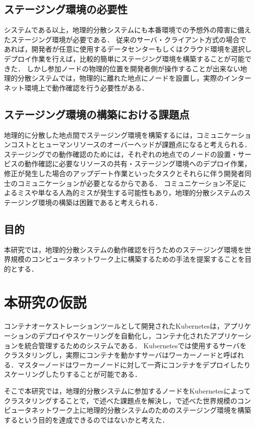 \subsection{ステージング環境の必要性}
システムである以上，地理的分散システムにも本番環境での予想外の障害に備えたステージング環境が必要である．
従来のサーバ・クライアント方式の場合であれば，開発者が任意に使用するデータセンターもしくはクラウド環境を選択しデプロイ作業を行えば，比較的簡単にステージング環境を構築することが可能できた．
しかし参加ノードの物理的位置を開発者側が操作することが出来ない地理的分散システムでは，物理的に離れた地点にノードを設置し，実際のインターネット環境上で動作確認を行う必要性がある．

\subsection{ステージング環境の構築における課題点}
地理的に分散した地点間でステージング環境を構築するには，コミュニケーションコストとヒューマンリソースのオーバーヘッドが課題点になると考えられる．
ステージングでの動作確認のためには，それぞれの地点でのノードの設置・サービスの動作確認に必要なリソースの共有・ステージング環境へのデプロイ作業，修正が発生した場合のアップデート作業といったタスクとそれらに伴う開発者同士のコミュニケーションが必要となるからである．
コミュニケーション不足によるミスや単なる人為的ミスが発生する可能性もあり，地理的分散システムのステージング環境の構築は困難であると考えられる．

\subsection{目的}
本研究では，地理的分散システムの動作確認を行うためのステージング環境を世界規模のコンピュータネットワーク上に構築するための手法を提案することを目的とする．

\section{本研究の仮説}
コンテナオーケストレーションツールとして開発されたKubernetesは，アプリケーションのデプロイやスケーリングを自動化し，コンテナ化されたアプリケーションを統合管理するためのシステムである．
Kubernetesでは使用するサーバをクラスタリングし，実際にコンテナを動かすサーバはワーカーノードと呼ばれる．マスターノードはワーカーノードに対して一斉にコンテナをデプロイしたりスケーリングしたりすることが可能である．

そこで本研究では，地理的分散システムに参加するノードをKubernetesによってクラスタリングすることで，{}で述べた課題点を解決し，{}で述べた世界規模のコンピュータネットワーク上に地理的分散システムのためのステージング環境を構築するという目的を達成できるのではないかと考えた．

